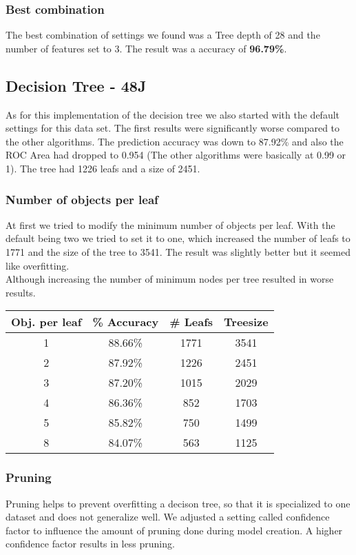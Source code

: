 \documentclass{article}
\begin{document}
\subsubsection{Best combination}
The best combination of settings we found was a Tree depth of 28 and the number of features set to 3. The result was a accuracy of \textbf{96.79\%}.
\subsection{Decision Tree - 48J}
As for this implementation of the decision tree we also started with the default settings for this data set. The first results were significantly worse compared to the other algorithms. The prediction accuracy was down to 87.92\% and also the ROC Area had dropped to 0.954 (The other algorithms were basically at 0.99 or 1). The tree had 1226 leafs and a size of 2451.
\subsubsection{Number of objects per leaf}
At first we tried to modify the minimum number of objects per leaf. With the default being two we tried to set it to one, which increased the number of leafs to 1771 and the size of the tree to 3541. The result was slightly better but it seemed like overfitting. \\
Although increasing the number of minimum nodes per tree resulted in worse results.\\

\begin{center}
\begin{tabular}{ c | c | c | c}
\textbf{Obj. per leaf} & \textbf{\% Accuracy} & \textbf{\# Leafs} & \textbf{Treesize}\\
\hline
1 & 88.66\% & 1771 & 3541\\
2 & 87.92\% & 1226 & 2451\\
3 & 87.20\% & 1015 & 2029\\
4 & 86.36\% & 852 & 1703\\
5 & 85.82\% & 750 & 1499\\
8 & 84.07\% & 563 & 1125\\
\end{tabular}
\end{center}

\subsubsection{Pruning}
Pruning helps to prevent overfitting a decison tree, so that it is specialized to one dataset and does not generalize well. We adjusted a setting called confidence factor to influence the amount of pruning done during model creation. A higher confidence factor results in less pruning.
\end{document}
